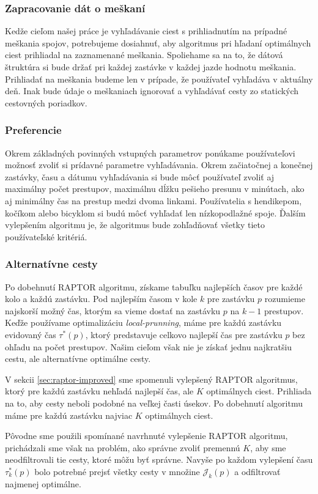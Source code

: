 \subsubsection{Zapracovanie dát o meškaní}
Kedže cieľom našej práce je vyhľadávanie ciest s prihliadnutím na prípadné meškania spojov, potrebujeme dosiahnuť, aby algoritmus pri hľadaní optimálnych ciest prihliadal na zaznamenané meškania. Spoliehame sa na to, že dátová štruktúra si bude držať pri každej zastávke v každej jazde hodnotu meškania. Prihliadať na meškania budeme len v prípade, že používateľ vyhľadáva v aktuálny deň. Inak bude údaje o meškaniach ignorovať a vyhľadávať cesty zo statických cestovných poriadkov.

\subsubsection{Preferencie}
Okrem základných povinných vstupných parametrov ponúkame používateľovi možnosť zvoliť si prídavné parametre vyhľadávania. Okrem začiatočnej a konečnej zastávky, času a dátumu vyhľadávania si bude môcť používateľ zvoliť aj maximálny počet prestupov, maximálnu dĺžku pešieho presunu v minútach, ako aj minimálny čas na prestup medzi dvoma linkami. Používatelia s hendikepom, kočíkom alebo bicyklom si budú môcť vyhľadať len nízkopodlažné spoje. Ďalším vylepšením algoritmu je, že algoritmus bude zohľadňovať všetky tieto používateľské kritériá. 

\subsubsection{Alternatívne cesty}
Po dobehnutí RAPTOR algoritmu, získame tabuľku najlepších časov pre každé kolo a každú zastávku. Pod najlepším časom v kole $k$ pre zastávku $p$ rozumieme najskorší možný čas, ktorým sa vieme dostať na zastávku $p$ na $k-1$ prestupov. Keďže používame optimalizáciu \textit{local-prunning}, máme pre každú zastávku evidovaný čas $\tau^*(p)$, ktorý predstavuje celkovo najlepší čas pre zastávku $p$ bez ohľadu na počet prestupov. Našim cieľom však nie je získať jednu najkratšiu cestu, ale alternatívne optimálne cesty.

V sekcii \ref{sec:raptor-improved} sme spomenuli vylepšený RAPTOR algoritmus, ktorý pre každú zastávku nehľadá najlepší čas, ale $K$ optimálnych ciest. Prihliada na to, aby cesty neboli podobné na veľkej časti úsekov. Po dobehnutí algoritmu máme pre každú zastávku najviac $K$ optimálnych ciest.

Pôvodne sme použili spomínané navrhnuté vylepšenie RAPTOR algoritmu, prichádzali sme však na problém, ako správne zvoliť premennú $K$, aby sme neodfiltrovali tie cesty, ktoré môžu byť správne. Navyše po každom vylepšení času $\tau^*_k(p)$ bolo potrebné prejsť všetky cesty v množine $\mathcal{J}_k(p)$ a odfiltrovať najmenej optimálne.

